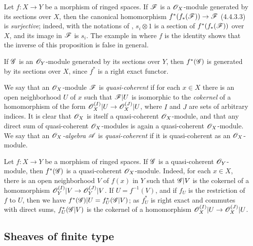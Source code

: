 \begin{env}[5.1.2]
\label{0.5.1.2}
Let $f:X\to Y$ be a morphism of ringed spaces.
If $\mathscr{F}$ is a $\mathscr{O}_X$-module generated by its sections over $X$, then the canonical homomorphism $f^*(f_*(\sh{F}))\to\sh{F}$ (4.4.3.3) is \emph{surjective};
indeed, with the notations of , $s_i\otimes 1$ is a section of $f^*(f_*(\mathscr{F}))$ over $X$, and its image in $\mathscr{F}$ is $s_i$.
The example in  where $f$ is the identity shows that the inverse of this proposition is false in general.

If $\mathscr{G}$ is an $\mathscr{O}_Y$-module generated by its sections over $Y$, then $f^*(\mathscr{G})$ is generated by its sections over $X$, since $f^*$ is a right exact functor.
\end{env}

\begin{env}[5.1.3]
\label{0.5.1.3}
We say that an $\mathscr{O}_X$-module $\mathscr{F}$ is \emph{quasi-coherent} if for each $x\in X$ there is an open neighborhood $U$ of $x$ such that $\mathscr{F}|U$ is isomorphic to the \emph{cokernel} of a homomorphism of the form $\OO_X^{(I)}|U\to\OO_X^{(J)}|U$, where $I$ and $J$ are sets of arbitrary indices.
It is clear that $\mathscr{O}_X$ is itself a quasi-coherent $\mathscr{O}_X$-module, and that any direct sum of quasi-coherent $\mathscr{O}_X$-modules is again a quasi-coherent $\mathscr{O}_X$-module.
We say that an \emph{$\mathscr{O}_X$-algebra $\mathscr{A}$} is \emph{quasi-coherent} if it is quasi-coherent as an $\mathscr{O}_X$-module.
\end{env}

\begin{env}[5.1.4]
\label{0.5.1.4}
Let $f:X\to Y$ be a morphism of ringed spaces.
If $\mathscr{G}$ is a quasi-coherent $\mathscr{O}_Y$-module, then $f^*(\mathscr{G})$ is a quasi-coherent $\mathscr{O}_X$-module.
Indeed, for each $x\in X$, there is an open neighborhood $V$ of $f(x)$ in $Y$ such that $\mathscr{G}|V$ is the cokernel of a homomorphism $\OO_Y^{(I)}|V\to\OO_Y^{(J)}|V$.
If $U=f^{-1}(V)$, and if $f_U$ is the restriction of $f$ to $U$, then we have $f^*(\mathscr{G})|U=f_U^*(\mathscr{G}|V)$;
as $f_U^*$ is right exact and commutes with direct sums, $f_U^*(\mathscr{G}|V)$ is the cokernel of a homomorphism $\OO_X^{(I)}|U\to\OO_X^{(J)}|U$.
\end{env}

\subsection{Sheaves of finite type}
\label{subsection-sheaves-of-finite-type}

